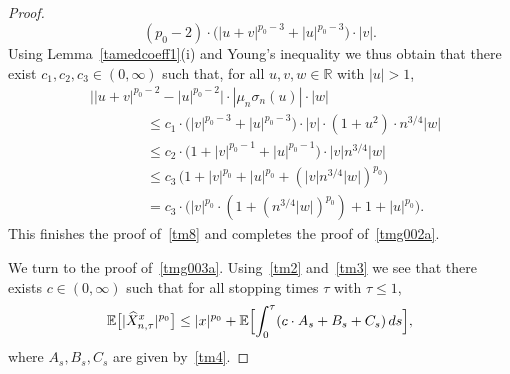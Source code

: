 \documentclass[11pt]{amsart}
\newcommand{\R}{{\mathbb R}}
\newcommand{\EE}{{\mathbb E}}
\theoremstyle{plain}
\theoremstyle{definition}
\begin{document}
\begin{proof}
\[(p_0-2)\cdot
\bigl(|u+v|^{p_0-3} + |u|^{p_0-3}\bigr)\cdot |v|.
\]
Using Lemma~\ref{tamedcoeff1}(i)
and Young's inequality we thus obtain that there exist $c_1, c_2, c_3\in (0,\infty)$ such that,  for all $u,v,w\in\R$ with  $|u|> 1$,
\begin{align*}
& \bigl||u+v|^{p_0-2} - |u|^{p_0-2}\bigr|\cdot |\mu_n\sigma_n(u)|\cdot|w|\\
& \qquad\qquad \le c_1\cdot\bigl(|v|^{p_0-3} + |u|^{p_0-3}\bigr)\cdot|v|\cdot(1+u^2)\cdot n^{3/4}|w|\\
& \qquad\qquad \le c_{2}\cdot \bigl(1+|v|^{p_0-1} + |u|^{p_0-1}\bigr)\cdot |v| n^{3/4}|w|\\
& \qquad\qquad \le c_{3}\,\bigl( 1+|v|^{p_0} + |u|^{p_0}+(|v|n^{3/4}|w|)^{p_0}\bigr)\\
& \qquad\qquad = c_{3}\cdot \bigl(|v|^{p_0}\cdot (1+(n^{3/4}|w|)^{p_0}) + 1 + |u|^{p_0}\bigr).
\end{align*}
This finishes the proof of~\eqref{tm8} and completes the proof of~\eqref{tmg002a}.

We turn to the proof of~\eqref{tmg003a}. Using~\eqref{tm2} and~\eqref{tm3} we see that there exists $c\in(0, \infty)$ such that for all stopping times $\tau$ with $\tau \le 1$,
\begin{equation}\label{o1}
 \EE\bigl[|\widehat X^x_{n,\tau}|^{p_0}\bigr]\le |x|^{p_0}+ \EE\Bigl[\int_0^\tau ( c\cdot A_s +B_s + C_s)\, ds\Bigr],
\end{equation}
where $A_s,B_s,C_s$ are given by~\eqref{tm4}.


\end{proof}
\end{document}
